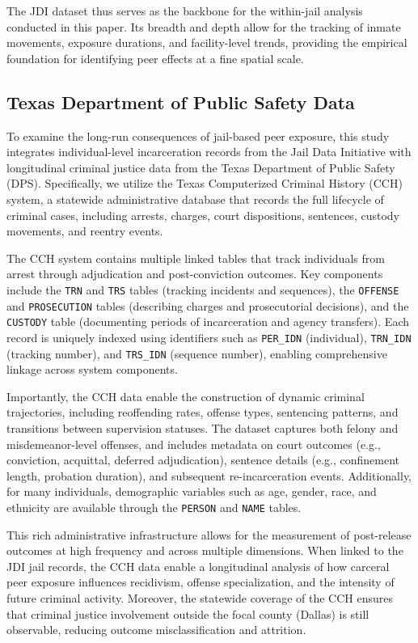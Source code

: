 \documentclass[12pt, a4paper]{article}
\begin{document}
The JDI dataset thus serves as the backbone for the within-jail analysis conducted in this paper. Its breadth and depth allow for the tracking of inmate movements, exposure durations, and facility-level trends, providing the empirical foundation for identifying peer effects at a fine spatial scale.

\subsection{Texas Department of Public Safety Data}

To examine the long-run consequences of jail-based peer exposure, this study integrates individual-level incarceration records from the Jail Data Initiative with longitudinal criminal justice data from the Texas Department of Public Safety (DPS). Specifically, we utilize the Texas Computerized Criminal History (CCH) system, a statewide administrative database that records the full lifecycle of criminal cases, including arrests, charges, court dispositions, sentences, custody movements, and reentry events.

The CCH system contains multiple linked tables that track individuals from arrest through adjudication and post-conviction outcomes. Key components include the \texttt{TRN} and \texttt{TRS} tables (tracking incidents and sequences), the \texttt{OFFENSE} and \texttt{PROSECUTION} tables (describing charges and prosecutorial decisions), and the \texttt{CUSTODY} table (documenting periods of incarceration and agency transfers). Each record is uniquely indexed using identifiers such as \texttt{PER\_IDN} (individual), \texttt{TRN\_IDN} (tracking number), and \texttt{TRS\_IDN} (sequence number), enabling comprehensive linkage across system components.

Importantly, the CCH data enable the construction of dynamic criminal trajectories, including reoffending rates, offense types, sentencing patterns, and transitions between supervision statuses. The dataset captures both felony and misdemeanor-level offenses, and includes metadata on court outcomes (e.g., conviction, acquittal, deferred adjudication), sentence details (e.g., confinement length, probation duration), and subsequent re-incarceration events. Additionally, for many individuals, demographic variables such as age, gender, race, and ethnicity are available through the \texttt{PERSON} and \texttt{NAME} tables.

This rich administrative infrastructure allows for the measurement of post-release outcomes at high frequency and across multiple dimensions. When linked to the JDI jail records, the CCH data enable a longitudinal analysis of how carceral peer exposure influences recidivism, offense specialization, and the intensity of future criminal activity. Moreover, the statewide coverage of the CCH ensures that criminal justice involvement outside the focal county (Dallas) is still observable, reducing outcome misclassification and attrition.
\end{document}
